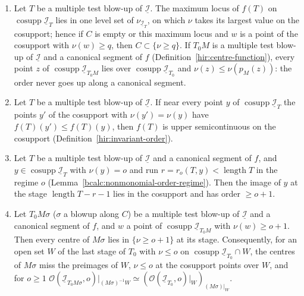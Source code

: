 \begin{lemma}
\begin{enumerate}
every point of the strict transform \(N'\) over \(C\).
\item Let \(T\) be a multiple test blow-up of \(\underline{\mathcal I}\). The maximum locus of \(f(T)\) on \(\operatorname{cosupp}\underline{\mathcal I}_T\) lies in one level set of
\(\nu_{\underline{\mathcal I}_T}\), on which \(\nu\) takes its largest value on the cosupport; hence if \(C\) is empty or this maximum locus and \(w\) is a point of the
cosupport with \(\nu(w)\ge q\), then \(C\subset\{\nu\ge q\}\). If \(T_0M\) is a multiple test blow-up of \(\underline{\mathcal I}\) and a canonical segment of \(f\)
(Definition~\ref{hir:centre-function}), every point \(z\) of \(\operatorname{cosupp}\underline{\mathcal I}_{T_0M}\) lies over \(\operatorname{cosupp}\underline{\mathcal I}_{T_0}\) and
\(\nu(z)\le\nu(p_M(z))\): the order never goes up along a canonical segment.
\item Let \(T\) be a multiple test blow-up of \(\underline{\mathcal I}\). If near every point \(y\) of \(\operatorname{cosupp}\underline{\mathcal I}_T\) the points \(y'\) of the cosupport
with \(\nu(y')=\nu(y)\) have \(f(T)(y')\le f(T)(y)\), then \(f(T)\) is upper semicontinuous on the cosupport (Definition~\ref{hir:invariant-order}).
\item Let \(T\) be a multiple test blow-up of \(\underline{\mathcal I}\) and a canonical segment of \(f\), and \(y\in\operatorname{cosupp}\underline{\mathcal I}_T\) with
\(\nu(y)=o\) and run \(r=r_o(T,y)<\operatorname{length}T\) in the regime \(o\) (Lemma~\ref{bcalc:nonmonomial-order-regime}). Then the image of \(y\) at the stage
\(\operatorname{length}T-r-1\) lies in the cosupport and has order \(\ge o+1\).
\item Let \(T_0M\sigma\) (\(\sigma\) a blowup along \(C\)) be a multiple test blow-up of \(\underline{\mathcal I}\) and a canonical segment of \(f\), and \(w\) a point of
\(\operatorname{cosupp}\underline{\mathcal I}_{T_0M}\) with \(\nu(w)\ge o+1\). Then every centre of \(M\sigma\) lies in \(\{\nu\ge o+1\}\) at its stage. Consequently, for an
open set \(W\) of the last stage of \(T_0\) with \(\nu\le o\) on \(\operatorname{cosupp}\underline{\mathcal I}_{T_0}\cap W\), the centres of \(M\sigma\) miss the preimages
of \(W\), \(\nu\le o\) at the cosupport points over \(W\), and for \(o\ge1\)
\(\mathcal O(\underline{\mathcal I}_{T_0M\sigma},o)|_{(M\sigma)^{-1}W}\simeq(\mathcal O(\underline{\mathcal I}_{T_0},o)|_W)_{(M\sigma)|_W}\).
\end{enumerate}
\end{lemma}
